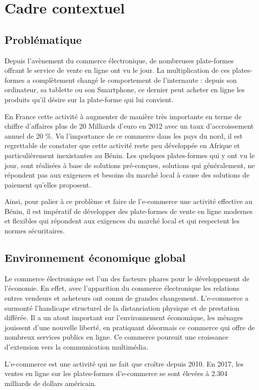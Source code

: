 \chapter{Cadre contextuel}
\section{Problématique}
Depuis l'avènement du commerce électronique, de nombreuses plate-formes offrant le service de vente en ligne ont vu le jour. La multiplication de ces plates-formes a complètement changé le comportement de l’internaute : depuis son ordinateur, sa tablette ou son Smartphone, ce dernier peut acheter en ligne les produits qu'il désire sur la plate-forme qui lui convient. 

En France cette activité à augmenter de manière très importante en terme de chiffre d'affaires plus de 20 Milliards d'euro en 2012 avec un taux d'accroissement annuel de 20 \%. Vu l'importance de ce commerce dans les pays du nord, il est regrettable de constater que cette activité reste peu développée en Afrique et particulièrement inexistantes au Bénin. Les quelques plates-formes qui y ont vu le jour, sont réalisées à base de solutions pré-conçues, solutions qui généralement, ne répondent pas aux exigences et besoins du marché local à cause des solutions de paiement qu'elles proposent. 

Ainsi, pour palier à ce problème et faire de l’e-commerce une activité effective au Bénin, il est impératif de développer des plate-formes de vente en ligne modernes et flexibles qui répondent aux exigences du marché local et qui respectent les normes sécuritaires.

\section{Environnement économique global}
Le commerce électronique est l'un des facteurs phares pour le développement de l'économie. En effet, avec l'apparition du commerce électronique les relations entres vendeurs et acheteurs ont connu de grandes changement. L'e-commerce a surmonté l'handicape structurel de la distanciation physique et de prestation différée.
Il a un atout important sur l'environnement économique, les ménages jouissent d'une nouvelle liberté, en pratiquant désormais ce commerce qui offre de nombreux services publics en ligne. Ce commerce poursuit une croissance d'extension vers la communication multimédia.

L'e-commerce est une activité qui ne fait que croître depuis 2010. En 2017, les ventes en ligne sur les plates-formes d'e-commerce se sont élevées à 2.304 milliards de dollars américain.

